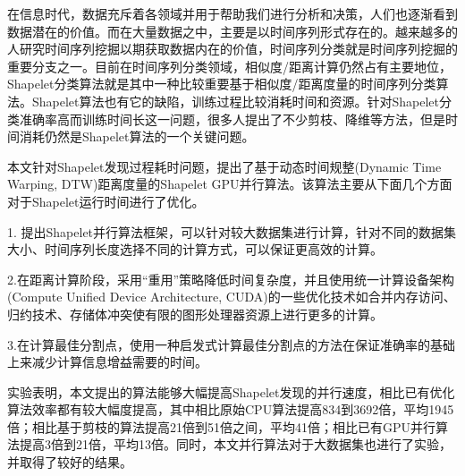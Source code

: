 \begin{cabstract}

在信息时代，数据充斥着各领域并用于帮助我们进行分析和决策，人们也逐渐看到数据潜在的价值。而在大量数据之中，主要是以时间序列形式存在的。越来越多的人研究时间序列挖掘以期获取数据内在的价值，时间序列分类就是时间序列挖掘的重要分支之一。目前在时间序列分类领域，相似度/距离计算仍然占有主要地位，Shapelet分类算法就是其中一种比较重要基于相似度/距离度量的时间序列分类算法。Shapelet算法也有它的缺陷，训练过程比较消耗时间和资源。针对Shapelet分类准确率高而训练时间长这一问题，很多人提出了不少剪枝、降维等方法，但是时间消耗仍然是Shapelet算法的一个关键问题。

本文针对Shapelet发现过程耗时问题，提出了基于动态时间规整(Dynamic Time Warping, DTW)距离度量的Shapelet GPU并行算法。该算法主要从下面几个方面对于Shapelet运行时间进行了优化。

1. 提出Shapelet并行算法框架，可以针对较大数据集进行计算，针对不同的数据集大小、时间序列长度选择不同的计算方式，可以保证更高效的计算。

2.在距离计算阶段，采用“重用”策略降低时间复杂度，并且使用统一计算设备架构(Compute Unified Device Architecture, CUDA)的一些优化技术如合并内存访问、归约技术、存储体冲突使有限的图形处理器资源上进行更多的计算。

3.在计算最佳分割点，使用一种启发式计算最佳分割点的方法在保证准确率的基础上来减少计算信息增益需要的时间。

实验表明，本文提出的算法能够大幅提高Shapelet发现的并行速度，相比已有优化算法效率都有较大幅度提高，其中相比原始CPU算法提高834到3692倍，平均1945倍；相比基于剪枝的算法提高21倍到51倍之间，平均41倍；相比已有GPU并行算法提高3倍到21倍，平均13倍。同时，本文并行算法对于大数据集也进行了实验，并取得了较好的结果。

 
 

\end{cabstract}


